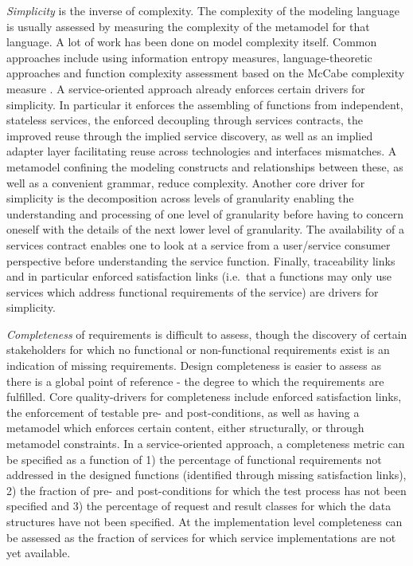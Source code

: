\emph{Simplicity} is the inverse of complexity. The complexity of the modeling language is usually assessed by measuring the complexity of the metamodel for that language\cite{mohagheghi_evaluating_2007}. A lot of work has been done on model complexity itself. Common approaches include using information entropy measures\cite{abrahamsson_extreme_2004}, language-theoretic approaches\cite{podgorelec_estimating_2007} and function complexity assessment based on the McCabe complexity measure \cite{mccabe_complexity_1976}. A service-oriented approach already enforces certain drivers for simplicity. In particular it enforces the assembling of functions from independent, stateless services, the enforced decoupling through services contracts, the improved reuse through the implied service discovery, as well as an implied adapter layer facilitating reuse across technologies and interfaces mismatches. A metamodel confining the modeling constructs and relationships between these, as well as a convenient grammar, reduce complexity. Another core driver for simplicity is the decomposition across levels of granularity enabling the understanding and processing of one level of granularity before having to concern oneself with the details of the next lower level of granularity. The availability of a services contract enables one to look at a service from a user/service consumer perspective before understanding the service function. Finally, traceability links and in particular enforced satisfaction links (i.e.\ that a functions may only use services which address functional requirements of the service) are drivers for simplicity.

\emph{Completeness} of requirements is difficult to assess, though the discovery of certain stakeholders for which no functional or non-functional requirements exist is an indication of missing requirements. Design completeness is easier to assess as there is a global point of reference - the degree to which the requirements are fulfilled. Core quality-drivers for completeness include enforced satisfaction links, the enforcement of testable pre- and post-conditions, as well as having a metamodel which enforces certain content, either structurally, or through metamodel constraints. In a service-oriented approach, a completeness metric can be specified as a function of 1) the percentage of functional requirements not addressed in the designed functions (identified through missing satisfaction links)\cite{shim_design_2008}, 2) the fraction of pre- and post-conditions for which the test process has not been specified and 3) the percentage of request and result classes for which the data structures have not been specified. At the implementation level completeness can be assessed as the fraction of services for which service implementations are not yet available.

